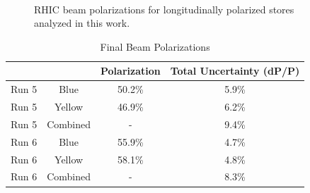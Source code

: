 \begin{figure}
   \\
  \caption{RHIC beam polarizations for longitudinally polarized stores analyzed in this work.}
  \label{fig:beam-polarizations}
\end{figure}

\begin{table}
  \centering
  \begin{tabular}{cc|cc}
    \hline
     & & Polarization & Total Uncertainty (dP/P)\\
    \hline
    Run 5 &  Blue & 50.2\% & 5.9\%\\
    Run 5 &  Yellow  & 46.9\% & 6.2\%\\
    Run 5 &  Combined & - & 9.4\%\\
    \hline
    Run 6 &  Blue & 55.9\% & 4.7\%\\
    Run 6 &  Yellow & 58.1\% & 4.8\%\\
    Run 6 &  Combined & - &  8.3\%\\
    \hline
  \end{tabular}
  \caption{Final Beam Polarizations}
  \label{tab:polarizations}
\end{table}
